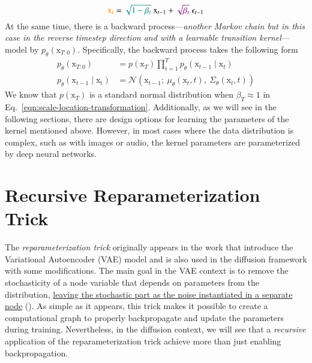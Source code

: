 \begin{equation}\label{eqn:scale-location-transformation}
    \textcolor{orange}{\mathrm{x}_{t}} = \textcolor{teal}{\sqrt{1-\beta_{t}}}~ \mathrm{x}_{t-1} + \textcolor{violet}{\sqrt{\beta_{t}}}~\mathrm{\epsilon}_{t-1}
\end{equation}
At the same time, there is a backward process---\textit{another Markov chain but in this case in the reverse timestep direction and with a learnable transition kernel}---model by $p_{\theta}(\mathrm{x}_{T:0})$. Specifically, 
the backward process takes the following form
\begin{align}\label{eqn:backward-process}
    p_{\theta}(\mathrm{x}_{T:0}) &= p(\mathrm{x}_{T})\prod_{t=1}^{T}p_{\theta}(\mathrm{x}_{t-1}\mid\mathrm{x}_{t})
    \\
    p_{\theta}(\mathrm{x}_{t-1}\mid\mathrm{x_{t}}) &= \mathcal{N}(\mathrm{x}_{t-1};~\mu_{\theta}(\mathrm{x}_{t}, t),~\Sigma_{\theta}(\mathrm{x}_{t}, t))
\end{align}
We know that $p(\mathrm{x}_{T})$ is a standard normal distribution when $\beta_{T}\approx 1$ in Eq.~\ref{eqn:scale-location-transformation}. Additionally, as we will see in the following sections, there are design options for learning 
the parameters of the kernel mentioned above. However, in most cases where the data distribution is complex, such as with images or audio, the kernel parameters are parameterized by deep neural networks.\\

\section{Recursive Reparameterization Trick}\label{sec:reparameterization-trick}

The \textit{reparameterization trick} originally appears in the work that introduce the Variational Autoencoder (VAE) model \cite{kingma2013auto} and is also used in the diffusion framework with some modifications. The main goal in the VAE context is to remove the stochasticity of a node variable that depends on parameters from the distribution, \href{https://web.archive.org/web/20160418040123/http://dpkingma.com/wordpress/wp-content/uploads/2015/12/talk_nips_workshop_2015.pdf}{leaving the stochastic part as the noise instantiated in a separate node} (). As simple as it appears, this trick makes it possible to create a computational graph to properly backpropagate and update the parameters during training. Nevertheless, in the diffusion context, we will
see that a \textit{recursive} application of the reparameterization trick achieve more than just enabling backpropagation. \\

